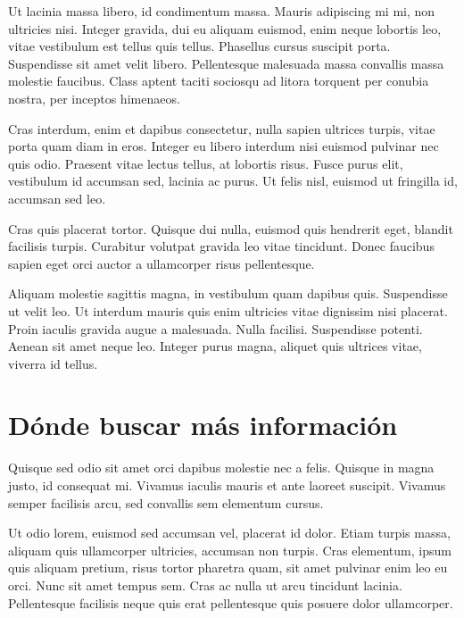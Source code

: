 \documentclass[12pt,a4paper]{report}
\begin{document}
Ut lacinia massa libero, id condimentum massa. Mauris adipiscing mi mi, non ultricies nisi. Integer gravida, dui eu aliquam euismod, enim neque lobortis leo, vitae vestibulum est tellus quis tellus. Phasellus cursus suscipit porta. Suspendisse sit amet velit libero. Pellentesque malesuada massa convallis massa molestie faucibus. Class aptent taciti sociosqu ad litora torquent per conubia nostra, per inceptos himenaeos. 

Cras interdum, enim et dapibus consectetur, nulla sapien ultrices turpis, vitae porta quam diam in eros. Integer eu libero interdum nisi euismod pulvinar nec quis odio. Praesent vitae lectus tellus, at lobortis risus. Fusce purus elit, vestibulum id accumsan sed, lacinia ac purus. Ut felis nisl, euismod ut fringilla id, accumsan sed leo. 

Cras quis placerat tortor. Quisque dui nulla, euismod quis hendrerit eget, blandit facilisis turpis. Curabitur volutpat gravida leo vitae tincidunt. Donec faucibus sapien eget orci auctor a ullamcorper risus pellentesque.

Aliquam molestie sagittis magna, in vestibulum quam dapibus quis. Suspendisse ut velit leo. Ut interdum mauris quis enim ultricies vitae dignissim nisi placerat. Proin iaculis gravida augue a malesuada. Nulla facilisi. Suspendisse potenti. Aenean sit amet neque leo. Integer purus magna, aliquet quis ultrices vitae, viverra id tellus. 





\section{Dónde buscar más información}
\label{seccion.buscarmas}



Quisque sed odio sit amet orci dapibus molestie nec a felis. Quisque in magna justo, id consequat mi. Vivamus iaculis mauris et ante laoreet suscipit. Vivamus semper facilisis arcu, sed convallis sem elementum cursus. 

Ut odio lorem, euismod sed accumsan vel, placerat id dolor. Etiam turpis massa, aliquam quis ullamcorper ultricies, accumsan non turpis. Cras elementum, ipsum quis aliquam pretium, risus tortor pharetra quam, sit amet pulvinar enim leo eu orci. Nunc sit amet tempus sem. Cras ac nulla ut arcu tincidunt lacinia. Pellentesque facilisis neque quis erat pellentesque quis posuere dolor ullamcorper. 
\end{document}
